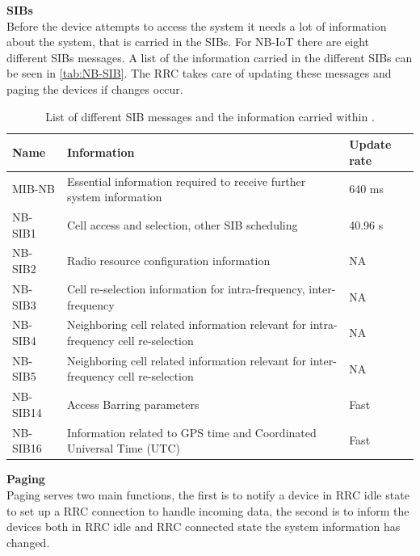 \textbf{\gls{SIB}s}\\
Before the device attempts to access the system it needs a lot of information about the system, that is carried in the \gls{SIB}s. For \gls{NB-IoT} there are eight different \gls{SIB}s messages. A list of the information carried in the different \gls{SIB}s can be seen in \autoref{tab:NB-SIB}. The \gls{RRC} takes care of updating these messages and paging the devices if changes occur.

\begin{table}[H]
\centering
\begin{tabular}{|p{3cm}|p{8cm}|p{3cm}|}\hline
\textbf{Name}		& \textbf{Information}																	& \textbf{Update rate}	\\\hline
\raggedright\arraybackslash\gls{MIB-NB}		& Essential information required to receive further system information 					& 640 ms				\\\hline
\raggedright\arraybackslash\gls{NB-SIB}1		& Cell access and selection, other SIB scheduling 										& 40.96 s 				\\\hline
\gls{NB-SIB}2		& Radio resource configuration information 												& NA 					\\\hline
\gls{NB-SIB}3		& Cell re-selection information for intra-frequency, inter-frequency 					& NA 					\\\hline
\gls{NB-SIB}4		& Neighboring cell related information relevant for intra-frequency cell re-selection 	& NA 					\\\hline
\gls{NB-SIB}5		& Neighboring cell related information relevant for inter-frequency cell re-selection 	& NA 					\\\hline
\gls{NB-SIB}14		& Access Barring parameters 															& Fast 					\\\hline
\gls{NB-SIB}16		& Information related to GPS time and Coordinated Universal Time (UTC) 					& Fast 					\\\hline
\end{tabular}
\caption{List of different \gls{SIB} messages and the information carried within \citep{whitepaper,REL-13}.}
\label{tab:NB-SIB}
\end{table}

\textbf{Paging} \\
Paging serves two main functions, the first is to notify a device in \gls{RRC} idle state to set up a \gls{RRC} connection to handle incoming data, the second is to inform the devices both in \gls{RRC} idle and \gls{RRC} connected state the system information has changed. \citep[ch. 7]{NB-IoT_Book}

